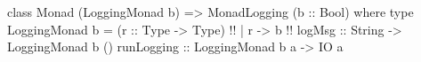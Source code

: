 \begin{code}
class Monad (LoggingMonad b)
      => MonadLogging (b :: Bool) where
  type LoggingMonad b = (r :: Type -> Type)  !!
         | r -> b  !!
  logMsg :: String -> LoggingMonad b ()
  runLogging :: LoggingMonad b a -> IO a
\end{code}

